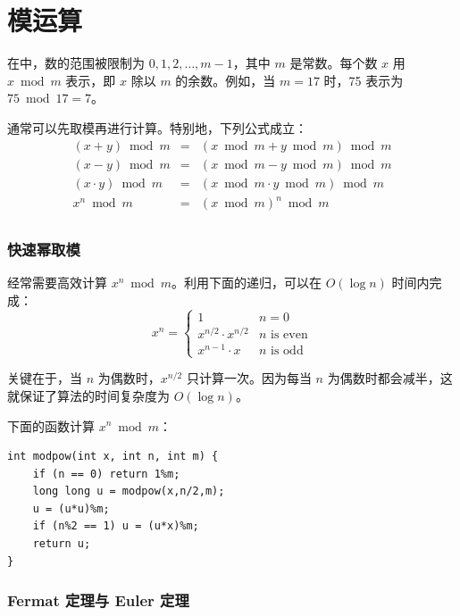 \section{模运算}


在中，数的范围被限制为 $0,1,2,\ldots,m-1$，其中 $m$ 是常数。每个数 $x$ 用 $x \bmod m$ 表示，即 $x$ 除以 $m$ 的余数。例如，当 $m=17$ 时，75 表示为 $75 \bmod 17 = 7$。

通常可以先取模再进行计算。特别地，下列公式成立：
\[
\begin{array}{rcl}
(x+y) \bmod m & = & (x \bmod m + y \bmod m) \bmod m \\
(x-y) \bmod m & = & (x \bmod m - y \bmod m) \bmod m \\
(x \cdot y) \bmod m & = & (x \bmod m \cdot y \bmod m) \bmod m \\
x^n \bmod m & = & (x \bmod m)^n \bmod m \\
\end{array}
\]

\subsubsection{快速幂取模}

经常需要高效计算 $x^n \bmod m$。利用下面的递归，可以在 $O(\log n)$ 时间内完成：
\begin{equation*}
    x^n = \begin{cases}
               1        & n = 0\\
               x^{n/2} \cdot x^{n/2} & \text{$n$ is even}\\
               x^{n-1} \cdot x & \text{$n$ is odd}
           \end{cases}
\end{equation*}

关键在于，当 $n$ 为偶数时，$x^{n/2}$ 只计算一次。因为每当 $n$ 为偶数时都会减半，这就保证了算法的时间复杂度为 $O(\log n)$。

下面的函数计算 $x^n \bmod m$：

\begin{lstlisting}
int modpow(int x, int n, int m) {
    if (n == 0) return 1%m;
    long long u = modpow(x,n/2,m);
    u = (u*u)%m;
    if (n%2 == 1) u = (u*x)%m;
    return u;
}
\end{lstlisting}

\subsubsection{Fermat 定理与 Euler 定理}

